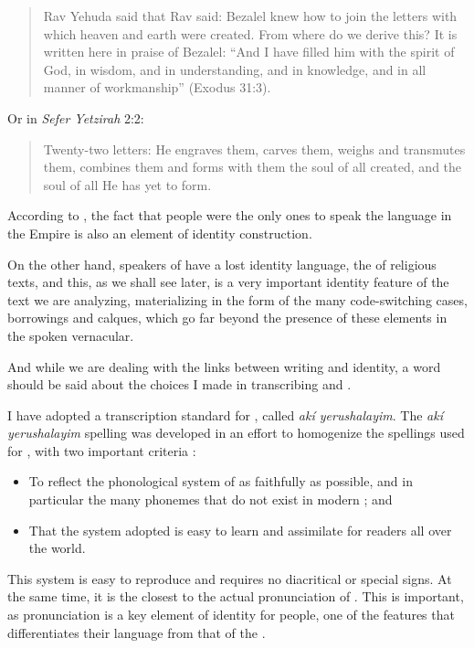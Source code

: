 \documentclass[output=paper,colorlinks,citecolor=brown,babel,arabicfont]{langscibook}
\begin{document}
\begin{quote}
Rav Yehuda said that Rav said: Bezalel knew how to join the letters with which heaven and earth were created. From where do we derive this? It is written here in praise of Bezalel: ``And I have filled him with the spirit of God, in wisdom, and in understanding, and in knowledge, and in all manner of workmanship'' (Exodus 31:3).
\end{quote}

Or in \textit{Sefer Yetzirah} 2:2:
\begin{quote}
Twenty-two letters: He engraves them, carves them, weighs and transmutes them, combines them and forms with them the soul of all created, and the soul of all He has yet to form.
\end{quote}

According to \citet[80]{bornes-varol2011}, the fact that  people were the only ones to speak the  language in the  Empire is also an element of identity construction. 

On the other hand, speakers of  have a lost identity language, the  of religious texts, and this, as we shall see later, is a very important identity feature of the text we are analyzing, materializing in the form of the many code-switching cases, borrowings and calques, which go far beyond the presence of these elements in the spoken vernacular. 

And while we are dealing with the links between writing and identity, a word should be said about the choices I made in transcribing  and .

I have adopted a transcription standard for , called \textit{akí yerushalayim}. The \textit{akí yerushalayim} spelling was developed in an effort to homogenize the spellings used for , with two important criteria \citep{shaul1985}: 

\begin{itemize}
 \item To reflect the phonological system of  as faithfully as possible, and in particular the many phonemes that do not exist in modern ; and 
 \item That the system adopted is easy to learn and assimilate for readers all over the world.
\end{itemize}

This system is easy to reproduce and requires no diacritical or special signs. At the same time, it is the closest to the actual pronunciation of . This is important, as pronunciation is a key element of identity for  people, one of the features that differentiates their language from that of the .
\end{document}
